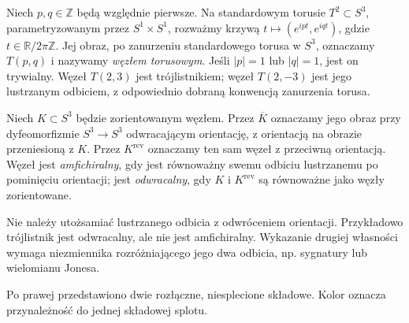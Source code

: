 \begin{przyklad}
Niech $p,q\in\mathbb Z$ będą względnie pierwsze. Na standardowym
torusie $T^2\subset S^3$, parametryzowanym przez
$S^1\times S^1$, rozważmy krzywą
$t\mapsto(e^{ipt},e^{iqt})$, gdzie $t\in\mathbb R/2\pi\mathbb Z$.
Jej obraz, po zanurzeniu standardowego torusa w $S^3$, oznaczamy
$T(p,q)$ i nazywamy \emph{węzłem torusowym}. Jeśli $|p|=1$
lub $|q|=1$, jest on trywialny. Węzeł $T(2,3)$ jest trójlistnikiem;
węzeł $T(2,-3)$ jest jego lustrzanym odbiciem, z odpowiednio
dobraną konwencją zanurzenia torusa.
\end{przyklad}

\begin{definicja}
Niech $K\subset S^3$ będzie zorientowanym węzłem.
Przez $\overline K$ oznaczamy jego obraz przy dyfeomorfizmie
$S^3\to S^3$ odwracającym orientację, z orientacją na obrazie
przeniesioną z $K$. Przez $K^{\mathrm{rev}}$ oznaczamy ten sam
węzeł z przeciwną orientacją. Węzeł jest \emph{amfichiralny},
gdy jest równoważny swemu odbiciu lustrzanemu po pominięciu
orientacji; jest \emph{odwracalny}, gdy $K$ i $K^{\mathrm{rev}}$
są równoważne jako węzły zorientowane.
\end{definicja}

\begin{uwaga}
Nie należy utożsamiać lustrzanego odbicia z odwróceniem orientacji.
Przykładowo trójlistnik jest odwracalny, ale nie jest amfichiralny.
Wykazanie drugiej własności wymaga niezmiennika rozróżniającego
jego dwa odbicia, np. sygnatury lub wielomianu Jonesa.
\end{uwaga}


\begin{center}
\end{center}
\noindent Po prawej przedstawiono dwie rozłączne, niesplecione składowe.
Kolor oznacza przynależność do jednej składowej splotu.

